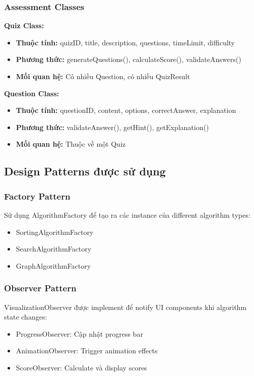 \subsubsection{Assessment Classes}

\textbf{Quiz Class:}
\begin{itemize}
    \item \textbf{Thuộc tính:} quizID, title, description, questions, timeLimit, difficulty
    \item \textbf{Phương thức:} generateQuestions(), calculateScore(), validateAnswers()
    \item \textbf{Mối quan hệ:} Có nhiều Question, có nhiều QuizResult
\end{itemize}

\textbf{Question Class:}
\begin{itemize}
    \item \textbf{Thuộc tính:} questionID, content, options, correctAnswer, explanation
    \item \textbf{Phương thức:} validateAnswer(), getHint(), getExplanation()
    \item \textbf{Mối quan hệ:} Thuộc về một Quiz
\end{itemize}

\subsection{Design Patterns được sử dụng}

\subsubsection{Factory Pattern}
Sử dụng AlgorithmFactory để tạo ra các instance của different algorithm types:
\begin{itemize}
    \item SortingAlgorithmFactory
    \item SearchAlgorithmFactory  
    \item GraphAlgorithmFactory
\end{itemize}

\subsubsection{Observer Pattern}
VisualizationObserver được implement để notify UI components khi algorithm state changes:
\begin{itemize}
    \item ProgressObserver: Cập nhật progress bar
    \item AnimationObserver: Trigger animation effects
    \item ScoreObserver: Calculate và display scores
\end{itemize}

